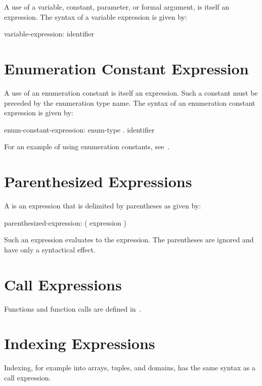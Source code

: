 A use of a variable, constant, parameter, or formal argument, is
itself an expression.  The syntax of a variable expression is given
by:
\begin{syntax}
variable-expression:
  identifier
\end{syntax}

\section{Enumeration Constant Expression}
\label{Enumeration_Constant_Expression}

A use of an enumeration constant is itself an expression.  Such a
constant must be preceded by the enumeration type name.  The syntax of
an enumeration constant expression is given by:
\begin{syntax}
enum-constant-expression:
  enum-type . identifier
\end{syntax}

For an example of using enumeration constants,
see~.

\section{Parenthesized Expressions}
\label{Parenthesized_Expressions}

A  is an expression that is delimited
by parentheses as given by:
\begin{syntax}
parenthesized-expression:
  ( expression )
\end{syntax}
Such an expression evaluates to the expression.  The parentheses are
ignored and have only a syntactical effect.

\section{Call Expressions}
\label{Call_Expressions}

Functions and function calls are defined in~.

\section{Indexing Expressions}
\label{Indexing_Expressions}

Indexing, for example into arrays, tuples, and domains,
has the same syntax as a call expression.
 
